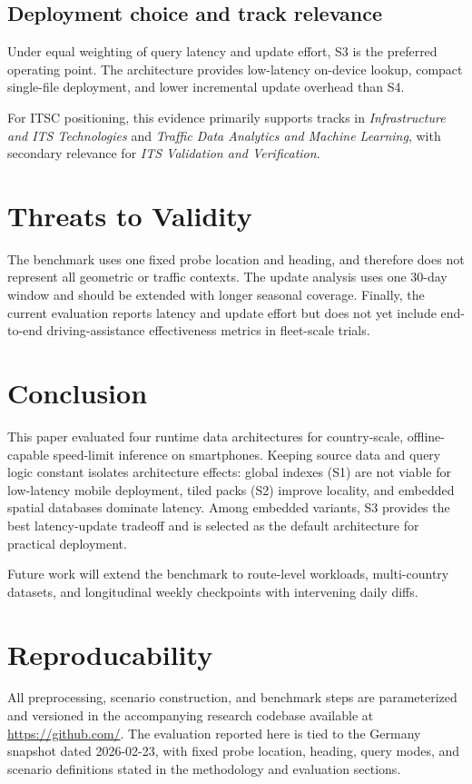 \documentclass[conference]{IEEEtran}
\begin{document}
\subsection{Deployment choice and track relevance}
Under equal weighting of query latency and update effort, S3 is the preferred operating point. The architecture provides low-latency on-device lookup, compact single-file deployment, and lower incremental update overhead than S4.

For ITSC positioning, this evidence primarily supports tracks in \emph{Infrastructure and ITS Technologies} and \emph{Traffic Data Analytics and Machine Learning}, with secondary relevance for \emph{ITS Validation and Verification}.

\section{Threats to Validity}
The benchmark uses one fixed probe location and heading, and therefore does not represent all geometric or traffic contexts. The update analysis uses one 30-day window and should be extended with longer seasonal coverage. Finally, the current evaluation reports latency and update effort but does not yet include end-to-end driving-assistance effectiveness metrics in fleet-scale trials.

\section{Conclusion}
This paper evaluated four runtime data architectures for country-scale, offline-capable speed-limit inference on smartphones. Keeping source data and query logic constant isolates architecture effects: global indexes (S1) are not viable for low-latency mobile deployment, tiled packs (S2) improve locality, and embedded spatial databases dominate latency. Among embedded variants, S3 provides the best latency-update tradeoff and is selected as the default architecture for practical deployment.

Future work will extend the benchmark to route-level workloads, multi-country datasets, and longitudinal weekly checkpoints with intervening daily diffs.

\section{Reproducability}
All preprocessing, scenario construction, and benchmark steps are parameterized and versioned in the accompanying research codebase available at \url{https://github.com/}. The evaluation reported here is tied to the Germany snapshot dated 2026-02-23, with fixed probe location, heading, query modes, and scenario definitions stated in the methodology and evaluation sections. 
\end{document}
